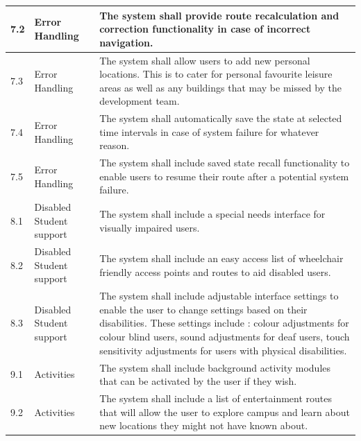 \documentclass[11pt]{article}
\begin{document}
\begin{longtable}{|p{}| p{} | p{} |}
\hline

7.2& Error Handling & The system shall provide route recalculation and correction functionality in case of incorrect navigation.\\

\hline

7.3& Error Handling & The system shall allow users to add new personal locations. This is to cater for personal favourite leisure areas as well as any buildings that may be missed by the development team. \\

\hline

7.4& Error Handling & The system shall automatically save the state at selected time intervals in case of system failure for whatever reason.\\

\hline

7.5& Error Handling & The system shall include saved state recall functionality to enable users to resume their route after a potential system failure.\\

\hline

8.1& Disabled Student support & The system shall include a special needs interface for visually impaired users.\\

\hline

8.2& Disabled Student support & The system shall include an easy access list of wheelchair friendly access points and routes to aid disabled users.\\

\hline

8.3& Disabled Student support & The system shall include adjustable interface settings to enable  the user to change settings based on their disabilities. These settings include : colour adjustments for colour blind users, sound adjustments for deaf users, touch sensitivity adjustments for users with physical disabilities.\\

\hline

9.1& Activities & The system shall include background activity modules that can be activated by the user if they wish.\\

\hline

9.2& Activities & The system shall include a list of entertainment routes that will allow the user to explore campus and learn about new locations they might not have known about.\\


\end{longtable}
\end{document}
